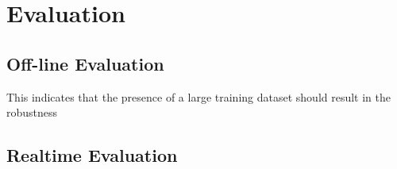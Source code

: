 \section{Evaluation}

\subsection{Off-line Evaluation}
This indicates that the presence of a large training dataset should result in the robustness 
\subsection{Realtime Evaluation}
